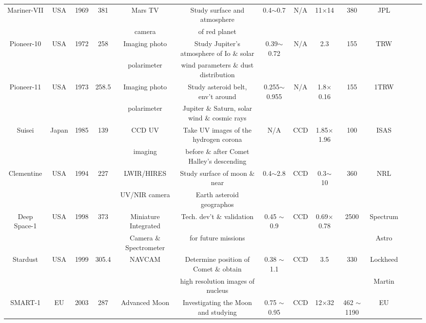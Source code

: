 \documentclass[final,5p,times,twocolumn,authoryear]{elsarticle}
\begin{document}
\begin{table}
{\begin{tabular}{c c c c c c c c c c c c c c}
			Mariner-VII & USA & 1969 & 381 & Mars TV & Study surface and atmosphere  & 0.4$\sim$0.7 & N/A & 11$\times$14 & 380 & JPL & \citep{siddiqi2018beyond, Henin2021ImagingOS}\\
			& & & & camera & of red planet & & & & & & & \\
			Pioneer-10 & USA & 1972& 258 & Imaging photo & Study Jupiter's atmosphere of Io $\&$ solar  & 0.39$\sim$0.72 & N/A & 2.3 & 155 & TRW & \citep{siddiqi2018beyond, gehrels1974imaging}\\
			& & & & polarimeter & wind parameters $\&$ dust distribution & & & & & & &\\
			Pioneer-11 & USA & 1973 & 258.5 & Imaging photo & Study asteroid belt, env't around  & 0.255$\sim$0.955 & N/A & 1.8$\times$0.16 & 155 & 1TRW & \citep{siddiqi2018beyond, fimmel1977pioneer}\\
			& & & & polarimeter & Jupiter $\&$ Saturn, solar wind $\&$ cosmic rays & & & & & & & &\\
			Suisei & Japan & 1985 & 139 & CCD UV  & Take UV images of the hydrogen corona & N/A & CCD & 1.85$\times$1.96 & 100 &  ISAS & \citep{siddiqi2018beyond, Henin2021ImagingOS}\\
			& & & & imaging & before $\&$ after Comet Halley's descending & & & & & & &\\
			Clementine & USA & 1994 & 227 & LWIR/HIRES & Study surface of moon $\&$ near  & 0.4$\sim$2.8 & CCD & 0.3$\sim$10 & 360 &  NRL & \citep{siddiqi2018beyond, nozette1994clementine}\\
			& & & & UV/NIR camera & Earth asteroid geographos & & & & & & &\\
			Deep Space-1 & USA & 1998 & 373 & Miniature Integrated & Tech. dev't $\&$ validation  & 0.45 $\sim$ 0.9 & CCD & 0.69$\times$0.78 &2500 &  Spectrum & \citep{rodgers2007advanced, siddiqi2018beyond}\\
			& & & & Camera $\&$ Spectrometer &  for future missions & & & &  &  Astro&\\
			Stardust & USA & 1999 & 305.4 & NAVCAM & Determine position of Comet $\&$ obtain & 0.38 $\sim$ 1.1 & CCD & 3.5 & 330 & Lockheed & \citep{siddiqi2018beyond, sandford2006organics}\\
			& & & & & high resolution images of nucleus & & & & &  Martin &\\
			SMART-1 & EU & 2003 & 287 & Advanced Moon & Investigating the Moon and studying  & 0.75 $\sim$ 0.95 & CCD & 12$\times$32 & 462 $\sim$ 1190 & EU & \citep{racca2002smart, Henin2021ImagingOS}\\

\end{tabular}}
\end{table}
\end{document}
